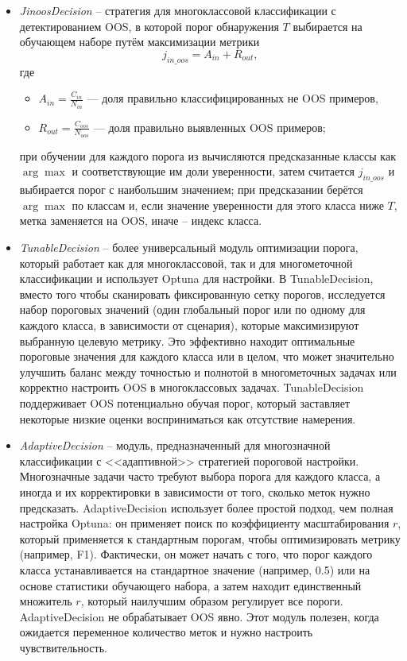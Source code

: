 \documentclass[14pt,a4paper,oneside,openany]{extbook}
\begin{document}
\begin{itemize}
\item \emph{JinoosDecision} -- стратегия для многоклассовой классификации с детектированием OOS, в которой порог обнаружения \(T\) выбирается на обучающем наборе путём максимизации метрики
$$j_{in\_oos} = A_{in} + R_{out},$$
где
\begin{itemize}
\item \(A_{in} = \frac{C_{in}}{N_{in}}\) — доля правильно классифицированных не OOS примеров,
\item \(R_{out} = \frac{C_{oos}}{N_{oos}}\) — доля правильно выявленных OOS примеров;
\end{itemize}
при обучении для каждого порога из вычисляются предсказанные классы как \(\arg\max\) и соответствующие им доли уверенности, затем считается \(j_{in\_oos}\) и выбирается порог с наибольшим значением; при предсказании берётся \(\arg\max\) по классам и, если значение уверенности для этого класса ниже \(T\), метка заменяется на OOS, иначе -- индекс класса.

\item \emph{TunableDecision} -- более универсальный модуль оптимизации порога, который работает как для многоклассовой, так и для многометочной классификации и использует Optuna для настройки. В TunableDecision, вместо того чтобы сканировать фиксированную сетку порогов, исследуется набор пороговых значений (один глобальный порог или по одному для каждого класса, в зависимости от сценария), которые максимизируют выбранную целевую метрику. Это эффективно находит оптимальные пороговые значения для каждого класса или в целом, что может значительно улучшить баланс между точностью и полнотой в многометочных задачах или корректно настроить OOS в многоклассовых задачах. TunableDecision поддерживает OOS потенциально обучая порог, который заставляет некоторые низкие оценки восприниматься как отсутствие намерения.

\item \emph{AdaptiveDecision}\autocite{hou_fewshot_2021} -- модуль, предназначенный для многозначной классификации с {}<<адаптивной>>{} стратегией пороговой настройки. Многозначные задачи часто требуют выбора порога для каждого класса, а иногда и их корректировки в зависимости от того, сколько меток нужно предсказать. AdaptiveDecision использует более простой подход, чем полная настройка Optuna: он применяет поиск по коэффициенту масштабирования \(r\), который применяется к стандартным порогам, чтобы оптимизировать метрику (например, F1). Фактически, он может начать с того, что порог каждого класса устанавливается на стандартное значение (например, 0.5) или на основе статистики обучающего набора, а затем находит единственный множитель \(r\), который наилучшим образом регулирует все пороги. AdaptiveDecision не обрабатывает OOS явно. Этот модуль полезен, когда ожидается переменное количество меток и нужно настроить чувствительность.
\end{itemize}
\end{document}
